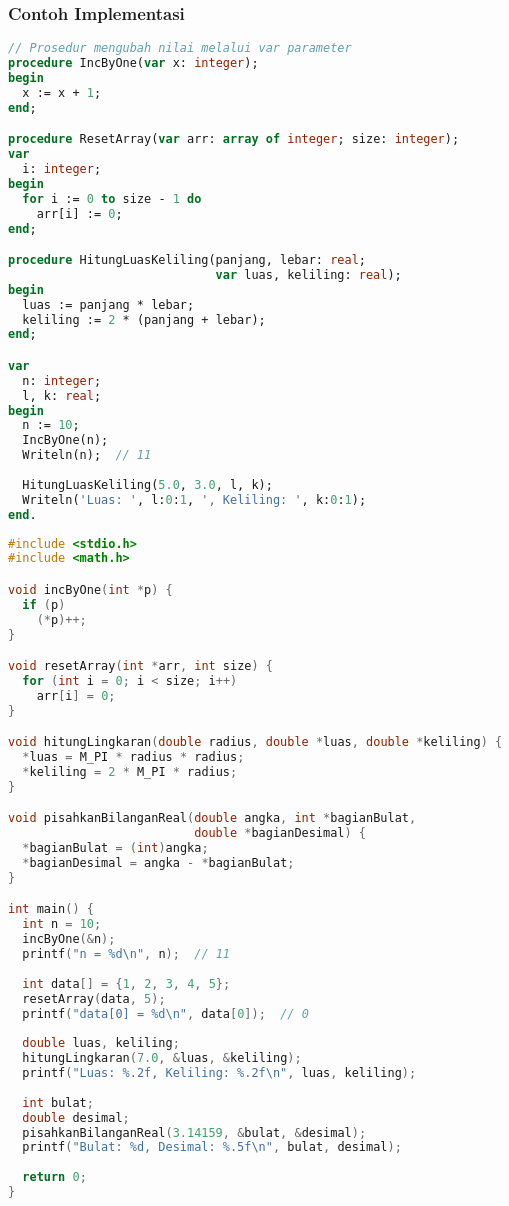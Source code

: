 \documentclass[../main.tex]{subfiles}
\begin{document}
\subsubsection{Contoh Implementasi}
\begin{lstlisting}[language=Pascal, caption={Pass by reference pada prosedur (Pascal)}]
// Prosedur mengubah nilai melalui var parameter
procedure IncByOne(var x: integer);
begin
  x := x + 1;
end;

procedure ResetArray(var arr: array of integer; size: integer);
var
  i: integer;
begin
  for i := 0 to size - 1 do
    arr[i] := 0;
end;

procedure HitungLuasKeliling(panjang, lebar: real; 
                             var luas, keliling: real);
begin
  luas := panjang * lebar;
  keliling := 2 * (panjang + lebar);
end;

var
  n: integer;
  l, k: real;
begin
  n := 10;
  IncByOne(n);
  Writeln(n);  // 11
  
  HitungLuasKeliling(5.0, 3.0, l, k);
  Writeln('Luas: ', l:0:1, ', Keliling: ', k:0:1);
end.
\end{lstlisting}

\begin{lstlisting}[language=C, caption={Pass by reference via pointer (C)}]
#include <stdio.h>
#include <math.h>

void incByOne(int *p) {
  if (p)
    (*p)++;
}

void resetArray(int *arr, int size) {
  for (int i = 0; i < size; i++)
    arr[i] = 0;
}

void hitungLingkaran(double radius, double *luas, double *keliling) {
  *luas = M_PI * radius * radius;
  *keliling = 2 * M_PI * radius;
}

void pisahkanBilanganReal(double angka, int *bagianBulat, 
                          double *bagianDesimal) {
  *bagianBulat = (int)angka;
  *bagianDesimal = angka - *bagianBulat;
}

int main() {
  int n = 10;
  incByOne(&n);
  printf("n = %d\n", n);  // 11
  
  int data[] = {1, 2, 3, 4, 5};
  resetArray(data, 5);
  printf("data[0] = %d\n", data[0]);  // 0
  
  double luas, keliling;
  hitungLingkaran(7.0, &luas, &keliling);
  printf("Luas: %.2f, Keliling: %.2f\n", luas, keliling);
  
  int bulat;
  double desimal;
  pisahkanBilanganReal(3.14159, &bulat, &desimal);
  printf("Bulat: %d, Desimal: %.5f\n", bulat, desimal);
  
  return 0;
}
\end{lstlisting}
\end{document}
